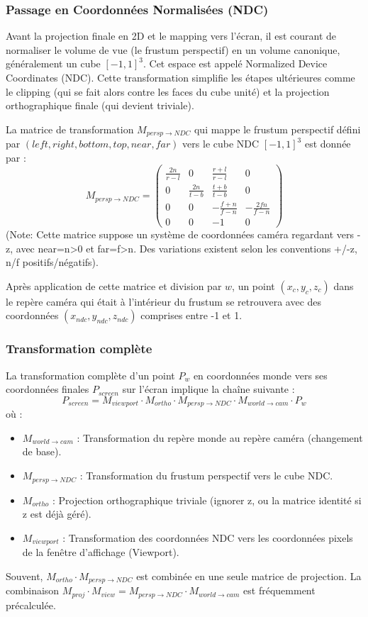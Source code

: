 \documentclass{article}
\begin{document}
\subsubsection{Passage en Coordonnées Normalisées (NDC)}
Avant la projection finale en 2D et le mapping vers l'écran, il est courant de normaliser le volume de vue (le frustum perspectif) en un volume canonique, généralement un cube $[-1, 1]^3$. Cet espace est appelé Normalized Device Coordinates (NDC).
Cette transformation simplifie les étapes ultérieures comme le clipping (qui se fait alors contre les faces du cube unité) et la projection orthographique finale (qui devient triviale).

La matrice de transformation $M_{persp \to NDC}$ qui mappe le frustum perspectif défini par $(left, right, bottom, top, near, far)$ vers le cube NDC $[-1, 1]^3$ est donnée par :
\[
M_{persp \to NDC} = \begin{pmatrix}
\frac{2n}{r-l} & 0 & \frac{r+l}{r-l} & 0 \\
0 & \frac{2n}{t-b} & \frac{t+b}{t-b} & 0 \\
0 & 0 & -\frac{f+n}{f-n} & -\frac{2fn}{f-n} \\
0 & 0 & -1 & 0
\end{pmatrix}
\]
(Note: Cette matrice suppose un système de coordonnées caméra regardant vers -z, avec near=n>0 et far=f>n. Des variations existent selon les conventions +/-z, n/f positifs/négatifs).

Après application de cette matrice et division par $w$, un point $(x_c, y_c, z_c)$ dans le repère caméra qui était à l'intérieur du frustum se retrouvera avec des coordonnées $(x_{ndc}, y_{ndc}, z_{ndc})$ comprises entre -1 et 1.

\subsubsection{Transformation complète}
La transformation complète d'un point $P_w$ en coordonnées monde vers ses coordonnées finales $P_{screen}$ sur l'écran implique la chaîne suivante :
\[ P_{screen} = M_{viewport} \cdot M_{ortho} \cdot M_{persp \to NDC} \cdot M_{world \to cam} \cdot P_w \]
où :
\begin{itemize}
    \item $M_{world \to cam}$ : Transformation du repère monde au repère caméra (changement de base).
    \item $M_{persp \to NDC}$ : Transformation du frustum perspectif vers le cube NDC.
    \item $M_{ortho}$ : Projection orthographique triviale (ignorer z, ou la matrice identité si z est déjà géré).
    \item $M_{viewport}$ : Transformation des coordonnées NDC vers les coordonnées pixels de la fenêtre d'affichage (Viewport).
\end{itemize}
Souvent, $M_{ortho} \cdot M_{persp \to NDC}$ est combinée en une seule matrice de projection. La combinaison $M_{proj} \cdot M_{view} = M_{persp \to NDC} \cdot M_{world \to cam}$ est fréquemment précalculée.
\end{document}
